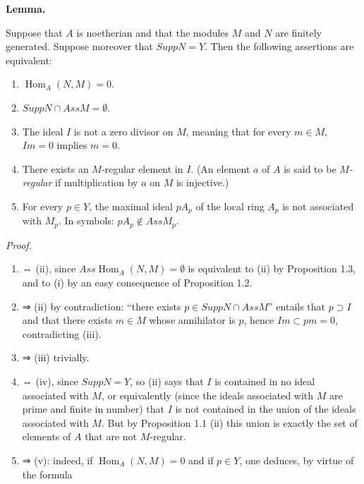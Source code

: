 \documentclass[
]{article}
\providecommand{\tightlist}{%
  \setlength{\itemsep}{0pt}\setlength{\parskip}{0pt}}
\begin{document}
\textbf{Lemma.}

Suppose that \(A\) is noetherian and that the modules \(M\) and \(N\)
are finitely generated. Suppose moreover that \(Supp N = Y\). Then the
following assertions are equivalent:

\begin{enumerate}
\def\labelenumi{\arabic{enumi}.}
\tightlist
\item
  \(\operatorname{Hom}_{A}(N, M) = 0\).
\item
  \(Supp N \cap Ass M = \emptyset\).
\item
  The ideal \(I\) is not a zero divisor on \(M\), meaning that for every
  \(m \in M\), \(Im = 0\) implies \(m = 0\).
\item
  There exists an \(M\)-regular element in \(I\). (An element \(a\) of
  \(A\) is said to be \emph{\(M\)-regular} if multiplication by \(a\) on
  \(M\) is injective.)
\item
  For every \(p \in Y\), the maximal ideal \(pA_{p}\) of the local ring
  \(A_{p}\) is not associated with \(M_{p}\). In symbols:
  \(pA_{p} \notin Ass M_{p}\).
\end{enumerate}

\emph{Proof.}

\begin{enumerate}
\def\labelenumi{(\roman{enumi})}
\item
  ⇔ (ii), since \(Ass \operatorname{Hom}_{A}(N, M) = \emptyset\) is
  equivalent to (ii) by Proposition 1.3, and to (i) by an easy
  consequence of Proposition 1.2.
\item
  ⇒ (ii) by contradiction: ``there exists \(p \in Supp N \cap Ass M\)''
  entails that \(p \supset I\) and that there exists \(m \in M\) whose
  annihilator is \(p\), hence \(Im \subset pm = 0\), contradicting
  (iii).
\item
  ⇒ (iii) trivially.
\item
  ⇔ (iv), since \(Supp N = Y\), so (ii) says that \(I\) is contained in
  no ideal associated with \(M\), or equivalently (since the ideals
  associated with \(M\) are prime and finite in number) that \(I\) is
  not contained in the union of the ideals associated with \(M\). But by
  Proposition 1.1 (ii) this union is exactly the set of elements of
  \(A\) that are not \(M\)-regular.
\item
  ⇒ (v): indeed, if \(\operatorname{Hom}_{A}(N, M) = 0\) and if
  \(p \in Y\), one deduces, by virtue of the formula
\end{enumerate}
\end{document}
